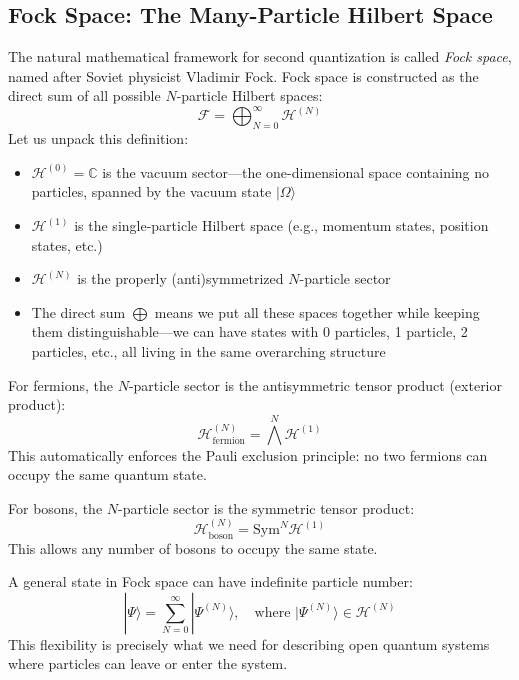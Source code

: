 \documentclass[12pt,oneside,openright]{report}
\theoremstyle{definition}
\theoremstyle{plain}
\theoremstyle{remark}
\begin{document}
\subsection{Fock Space: The Many-Particle Hilbert Space}
\label{subsec:fock_space}
The natural mathematical framework for second quantization is called \emph{Fock space}, 
named after Soviet physicist Vladimir Fock. Fock space is constructed as the direct sum 
of all possible $N$-particle Hilbert spaces:
\begin{equation}
\mathcal{F} = \bigoplus_{N=0}^{\infty} \mathcal{H}^{(N)}
\label{eq:fock_space_def}
\end{equation}
Let us unpack this definition:
\begin{itemize}
\item $\mathcal{H}^{(0)} = \mathbb{C}$ is the vacuum sector—the one-dimensional space containing 
no particles, spanned by the vacuum state $|\Omega\rangle$
\item $\mathcal{H}^{(1)}$ is the single-particle Hilbert space (e.g., momentum states, position states, etc.)
\item $\mathcal{H}^{(N)}$ is the properly (anti)symmetrized $N$-particle sector
\item The direct sum $\bigoplus$ means we put all these spaces together while keeping them 
distinguishable—we can have states with 0 particles, 1 particle, 2 particles, etc., all living 
in the same overarching structure
\end{itemize}

For fermions, the $N$-particle sector is the antisymmetric tensor product (exterior product):
\begin{equation}
\mathcal{H}^{(N)}_{\mathrm{fermion}} = \bigwedge^N \mathcal{H}^{(1)}
\end{equation}
This automatically enforces the Pauli exclusion principle: no two fermions can occupy the same 
quantum state.

For bosons, the $N$-particle sector is the symmetric tensor product:
\begin{equation}
\mathcal{H}^{(N)}_{\mathrm{boson}} = \mathrm{Sym}^N \mathcal{H}^{(1)}
\end{equation}
This allows any number of bosons to occupy the same state.

A general state in Fock space can have indefinite particle number:
\begin{equation}
|\Psi\rangle = \sum_{N=0}^{\infty} |\Psi^{(N)}\rangle, \quad \text{where } |\Psi^{(N)}\rangle \in \mathcal{H}^{(N)}
\end{equation}
This flexibility is precisely what we need for describing open quantum systems where particles 
can leave or enter the system.
\end{document}
